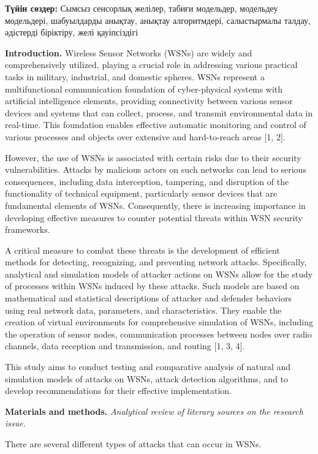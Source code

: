 {\bfseries Түйін сөздер:} Сымсыз сенсорлық желілер, табиғи модельдер,
модельдеу модельдері, шабуылдарды анықтау, анықтау алгоритмдері,
салыстырмалы талдау, әдістерді біріктіру, желі қауіпсіздігі

{\bfseries Introduction.} Wireless Sensor Networks (WSNs) are widely and
comprehensively utilized, playing a crucial role in addressing various
practical tasks in military, industrial, and domestic spheres. WSNs
represent a multifunctional communication foundation of cyber-physical
systems with artificial intelligence elements, providing connectivity
between various sensor devices and systems that can collect, process,
and transmit environmental data in real-time. This foundation enables
effective automatic monitoring and control of various processes and
objects over extensive and hard-to-reach areas {[}1, 2{]}.

However, the use of WSNs is associated with certain risks due to their
security vulnerabilities. Attacks by malicious actors on such networks
can lead to serious consequences, including data interception,
tampering, and disruption of the functionality of technical equipment,
particularly sensor devices that are fundamental elements of WSNs.
Consequently, there is increasing importance in developing effective
measures to counter potential threats within WSN security frameworks.

A critical measure to combat these threats is the development of
efficient methods for detecting, recognizing, and preventing network
attacks. Specifically, analytical and simulation models of attacker
actions on WSNs allow for the study of processes within WSNs induced by
these attacks. Such models are based on mathematical and statistical
descriptions of attacker and defender behaviors using real network data,
parameters, and characteristics. They enable the creation of virtual
environments for comprehensive simulation of WSNs, including the
operation of sensor nodes, communication processes between nodes over
radio channels, data reception and transmission, and routing {[}1, 3,
4{]}.

This study aims to conduct testing and comparative analysis of natural
and simulation models of attacks on WSNs, attack detection algorithms,
and to develop recommendations for their effective implementation.

{\bfseries Materials and methods.} \emph{Analytical review of literary
sources on the research issue.}

There are several different types of attacks that can occur in WSNs.

